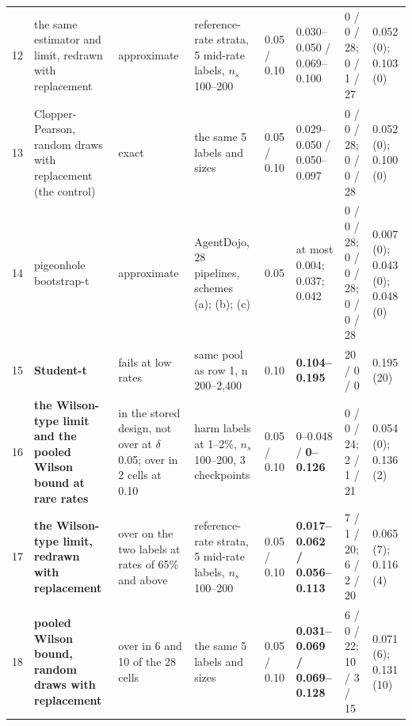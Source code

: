 \begin{tabular}{@{}r p{2.8cm} p{2.0cm} p{3.9cm} l p{2.1cm} p{2.0cm} p{1.9cm}@{}}
12 & the same estimator and limit, redrawn with replacement & approximate & reference-rate strata, 5 mid-rate labels, $n_s$ 100--200 & 0.05 / 0.10 & 0.030--0.050 / 0.069--0.100 & 0 / 0 / 28; 0 / 1 / 27 & 0.052 (0); 0.103 (0) \\
13 & Clopper-Pearson, random draws with replacement (the control) & exact & the same 5 labels and sizes & 0.05 / 0.10 & 0.029--0.050 / 0.050--0.097 & 0 / 0 / 28; 0 / 0 / 28 & 0.052 (0); 0.100 (0) \\
14 & pigeonhole bootstrap-t & approximate & AgentDojo, 28 pipelines, schemes (a); (b); (c) & 0.05 & at most 0.004; 0.037; 0.042 & 0 / 0 / 28; 0 / 0 / 28; 0 / 0 / 28 & 0.007 (0); 0.043 (0); 0.048 (0) \\
15 & \textbf{Student-t} & fails at low rates & same pool as row 1, n 200--2,400 & 0.10 & \textbf{0.104--0.195} & 20 / 0 / 0 & 0.195 (20) \\
16 & \textbf{the Wilson-type limit and the pooled Wilson bound at rare rates} & in the stored design, not over at $\delta$ 0.05; over in 2 cells at 0.10 & harm labels at 1--2\%, $n_s$ 100--200, 3 checkpoints & 0.05 / 0.10 & 0--0.048 / \textbf{0--0.126} & 0 / 0 / 24; 2 / 1 / 21 & 0.054 (0); 0.136 (2) \\
17 & \textbf{the Wilson-type limit, redrawn with replacement} & over on the two labels at rates of 65\% and above & reference-rate strata, 5 mid-rate labels, $n_s$ 100--200 & 0.05 / 0.10 & \textbf{0.017--0.062 / 0.056--0.113} & 7 / 1 / 20; 6 / 2 / 20 & 0.065 (7); 0.116 (4) \\
18 & \textbf{pooled Wilson bound, random draws with replacement} & over in 6 and 10 of the 28 cells & the same 5 labels and sizes & 0.05 / 0.10 & \textbf{0.031--0.069 / 0.069--0.128} & 6 / 0 / 22; 10 / 3 / 15 & 0.071 (6); 0.131 (10) \\
\bottomrule
\end{tabular}
